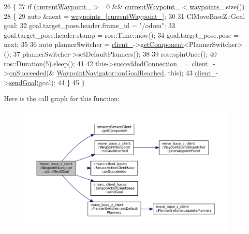 \begin{DoxyCode}
26 \{
27   \textcolor{keywordflow}{if} (\hyperlink{classmove__base__z__client_1_1WaypointNavigator_a7da763128724f7b08c32c79cb3a88934}{currentWaypoint\_} >= 0 && \hyperlink{classmove__base__z__client_1_1WaypointNavigator_a7da763128724f7b08c32c79cb3a88934}{currentWaypoint\_} < 
      \hyperlink{classmove__base__z__client_1_1WaypointNavigator_a83e4e39987eaf1c8856d32d581eb4cd0}{waypoints\_}.size())
28   \{
29     \textcolor{keyword}{auto} &next = \hyperlink{classmove__base__z__client_1_1WaypointNavigator_a83e4e39987eaf1c8856d32d581eb4cd0}{waypoints\_}[\hyperlink{classmove__base__z__client_1_1WaypointNavigator_a7da763128724f7b08c32c79cb3a88934}{currentWaypoint\_}];
30 
31     ClMoveBaseZ::Goal goal;
32     goal.target\_pose.header.frame\_id = \textcolor{stringliteral}{"/odom"};
33     goal.target\_pose.header.stamp = ros::Time::now();
34     goal.target\_pose.pose = next;
35 
36     \textcolor{keyword}{auto} plannerSwitcher = \hyperlink{classmove__base__z__client_1_1WaypointNavigator_aadb289ffdaeda3a751fe569a2ee84c48}{client\_}->\hyperlink{classsmacc_1_1ISmaccClient_adef78db601749ca63c19e74a27cb88cc}{getComponent}<PlannerSwitcher>();
37     plannerSwitcher->setDefaultPlanners();
38 
39     ros::spinOnce();
40     ros::Duration(5).sleep();
41 
42     this->\hyperlink{classmove__base__z__client_1_1WaypointNavigator_a139d492345875777d9c9a79f9b2d494b}{succeddedConnection\_} = \hyperlink{classmove__base__z__client_1_1WaypointNavigator_aadb289ffdaeda3a751fe569a2ee84c48}{client\_}->\hyperlink{classsmacc_1_1client__bases_1_1SmaccActionClientBase_af6d77c27d21b2e4f621f53c5f1df088b}{onSucceeded}(&
      \hyperlink{classmove__base__z__client_1_1WaypointNavigator_ae4c5a879ff016f197c1cec54b2adaa1b}{WaypointNavigator::onGoalReached}, \textcolor{keyword}{this});
43     \hyperlink{classmove__base__z__client_1_1WaypointNavigator_aadb289ffdaeda3a751fe569a2ee84c48}{client\_}->\hyperlink{classsmacc_1_1client__bases_1_1SmaccActionClientBase_a9c47a5094ac8afb01680307fe5eca922}{sendGoal}(goal);
44   \}
45 \}
\end{DoxyCode}


Here is the call graph for this function\+:
\nopagebreak
\begin{figure}[H]
\begin{center}
\leavevmode
\includegraphics[width=350pt]{classmove__base__z__client_1_1WaypointNavigator_a376c1b5f822325122d29ad4f6e568b08_cgraph}
\end{center}
\end{figure}





